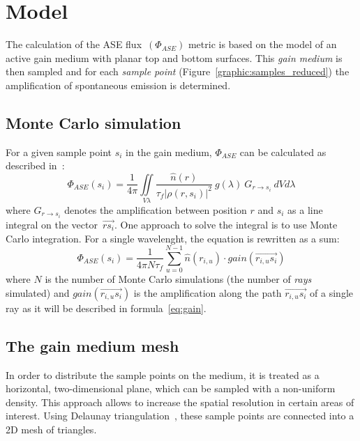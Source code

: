 \section{Model}
The calculation of the ASE flux~$(\Phi_{ASE})$ metric is based on the model of an
active gain medium with planar top and bottom surfaces. This \emph{gain medium} is
then sampled and for each \emph{sample point} (Figure~\ref{graphic:samples_reduced}) the amplification of spontaneous emission is
determined. 

\subsection{Monte Carlo simulation}
\label{subsec:monteCarlo}
For a given sample point $s_i$ in the gain medium, $\Phi_{ASE}$ can
be calculated as described in~\cite{ASE2010}:
\begin{equation}
  \label{eq:phi_ase_daniel} 
  \Phi_{ASE}(s_i)=\frac{1}{4\pi}\iint\limits_{V \lambda}
  \frac
    {\hat{n}(r)}
    {\tau_{f}|\rho(r,s_i)|^2}~g(\lambda)~G_{r\rightarrow s_i}~dV d\lambda
\end{equation}
where $G_{r\rightarrow s_i}$ denotes the amplification between
position $r$ and $s_i$ as a line integral on the vector~$\overrightarrow{rs_i}$.
One approach to solve the integral is to use Monte Carlo integration. For a
single wavelenght, the equation is rewritten as a sum:
\begin{equation}
  \label{eq:monte_carlo_ase}
  \Phi_{ASE}(s_i) = 
  \frac{1}{4\pi N\tau_f}
  \sum^{N-1}_{u=0} \hat{n}(r_{i,u}) \cdot gain(\overrightarrow{r_{i,u}s_i})
\end{equation}
where $N$ is the number of Monte Carlo simulations (the number of \emph{rays}
simulated) and $gain(\overrightarrow{r_{i,u}s_i})$ is the amplification along the
path $\overrightarrow{r_{i,u}s_i}$ of a single ray as it will be described in
formula~\eqref{eq:gain}. 


\subsection{The gain medium mesh} \label{subsec:meshSampling}
In order to distribute the sample points on the medium, it is treated as
a horizontal, two-dimensional plane, which can be sampled with a non-uniform
density. This approach allows to increase the spatial resolution in certain
areas of interest. Using Delaunay triangulation~\cite{delaunay_triangulation},
these sample points are connected into a 2D mesh of triangles.

